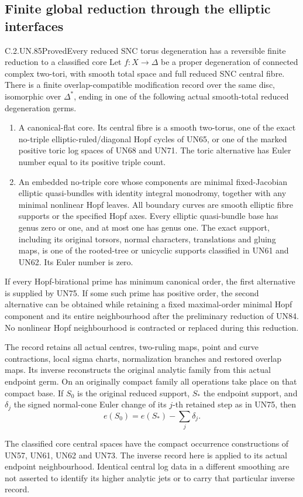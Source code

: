 \subsection{Finite global reduction through the elliptic interfaces}

\begin{statement}{C.2.UN.85}{Proved}{Every reduced SNC torus degeneration has a reversible finite reduction to a classified core}
Let \(f:X\to\Delta\) be a proper degeneration of connected
complex two-tori, with smooth total space and full reduced
SNC central fibre. There is a finite overlap-compatible
modification record over the same disc, isomorphic over
\(\Delta^*\), ending in one of the following actual
smooth-total reduced degeneration germs.

\begin{enumerate}
\item A canonical-flat core. Its central fibre is a smooth
two-torus, one of the exact no-triple elliptic-ruled/diagonal
Hopf cycles of UN65, or one of the marked positive toric
log spaces of UN68 and UN71. The toric alternative has
Euler number equal to its positive triple count.

\item An embedded no-triple core whose components are
minimal fixed-Jacobian elliptic quasi-bundles with identity
integral monodromy, together with any minimal nonlinear
Hopf leaves. All boundary curves are smooth elliptic fibre
supports or the specified Hopf axes. Every elliptic
quasi-bundle base has genus zero or one, and at most one
has genus one. The exact support, including its original
torsors, normal characters, translations and gluing maps,
is one of the rooted-tree or unicyclic supports classified
in UN61 and UN62. Its Euler number is zero.
\end{enumerate}

If every Hopf-birational prime has minimum canonical order,
the first alternative is supplied by UN75. If some such
prime has positive order, the second alternative can be
obtained while retaining a fixed maximal-order minimal
Hopf component and its entire neighbourhood after the
preliminary reduction of UN84. No nonlinear Hopf
neighbourhood is contracted or replaced during this
reduction.

The record retains all actual centres, two-ruling maps,
point and curve contractions, local sigma charts,
normalization branches and restored overlap maps.
Its inverse reconstructs the original analytic family
from this actual endpoint germ. On an originally compact
family all operations take place on that compact base.
If \(S_0\) is the original reduced support, \(S_*\) the
endpoint support, and \(\delta_j\) the signed normal-cone
Euler change of its \(j\)-th retained step as in UN75,
then
\[
                 e(S_0)=e(S_*)-\sum_j\delta_j.
 \tag{C.GP.1}
\]

The classified core central spaces have the compact
occurrence constructions of UN57, UN61, UN62 and UN73.
The inverse record here is applied to its actual endpoint
neighbourhood. Identical central log data in a different
smoothing are not asserted to identify its higher analytic
jets or to carry that particular inverse record.
\end{statement}

